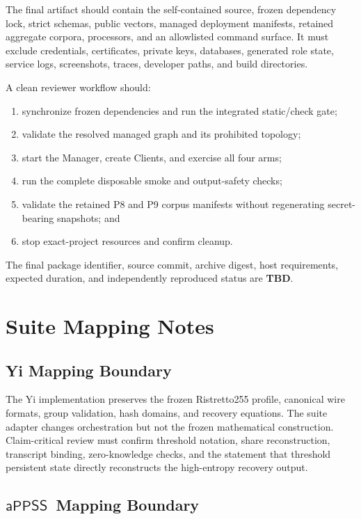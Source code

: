 \documentclass[sigconf,anonymous]{acmart}
\newcommand{\APPSS}{\ensuremath{\mathsf{aPPSS}}}
\newcommand{\TBD}{\textbf{TBD}}
\begin{document}
The final artifact should contain the self-contained
 source, frozen dependency lock, strict schemas,
public vectors, managed deployment manifests, retained aggregate corpora,
processors, and an allowlisted command surface. It must exclude credentials,
certificates, private keys, databases, generated role state, service logs,
screenshots, traces, developer paths, and build directories.

A clean reviewer workflow should:
\begin{enumerate}
  \item synchronize frozen dependencies and run the integrated static/check
  gate;
  \item validate the resolved managed graph and its prohibited topology;
  \item start the Manager, create Clients, and exercise all four arms;
  \item run the complete disposable smoke and output-safety checks;
  \item validate the retained P8 and P9 corpus manifests without regenerating
  secret-bearing snapshots; and
  \item stop exact-project resources and confirm cleanup.
\end{enumerate}
The final package identifier, source commit, archive digest, host requirements,
expected duration, and independently reproduced status are \TBD.

\section{Suite Mapping Notes}

\subsection{Yi Mapping Boundary}

The Yi implementation preserves the frozen Ristretto255 profile, canonical
wire formats, group validation, hash domains, and recovery equations. The
suite adapter changes orchestration but not the frozen mathematical
construction. Claim-critical review must confirm threshold notation, share
reconstruction, transcript binding, zero-knowledge checks, and the statement
that threshold persistent state directly reconstructs the high-entropy
recovery output.

\subsection{\APPSS\ Mapping Boundary}
\end{document}
